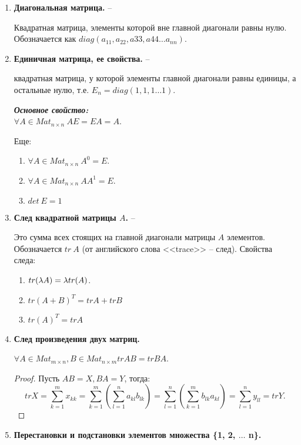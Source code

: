 \begin{enumerate}
	\item \textbf{Диагональная матрица.} --
	
	Квадратная матрица, элементы которой вне главной диагонали равны нулю. Обозначается как $diag(a_{11}, a_{22}, a{33}, a{44} \ldots a_{nn})$.
	
	\item \textbf{Единичная матрица, ее свойства.} --
	
	квадратная матрица, у которой элементы главной диагонали равны единицы, а остальные нулю, т.е. $E_n = diag(1,1,1 \ldots 1)$. 
	
	\textit{\textbf{Основное свойство:}}\\
	$\forall A \in Mat_{n \times n}\ AE = EA = A$.
	
	Еще: 	
	\begin{enumerate}
		\item $\forall A \in Mat_{n \times n}\ A^0 = E$.
		\item $\forall A \in Mat_{n \times n}\ A A^{1} = E$.
		\item $det\ E = 1$
	\end{enumerate}
	
	\item \textbf{След квадратной матрицы $A$.} --
	
	Это сумма всех стоящих на главной диагонали матрицы $A$ элементов. \\
	Обозначается $tr\ A$ (от английского слова <<trace>> -- след).
	Свойства следа:
	\begin{enumerate}
		\item $tr(\lambda A) = \lambda tr(A)$.
		\item $tr(A + B)^T = trA + trB$
		\item $tr(A)^T = trA$
	\end{enumerate}
	
	\item \textbf{След произведения двух матриц.}
	
	$\forall A \in Mat_{m \times n}, B \in Mat_{n \times m} trAB = tr BA$.
	\begin{proof}
		Пусть $AB = X, BA = Y$, тогда:
		\[
		tr X = \sum_{k=1}^{m} x_{kk} = \sum_{k=1}^{m}\left(\sum_{l=1}^{n} a_{kl}b_{lk}\right) = \sum_{l=1}^{n} \left( \sum_{k=1}^{m}b_{lk}a_{kl} \right) = \sum_{l=1}^{n}y_{ll} = tr Y.
		\]
	\end{proof}
	
	\item \textbf{Перестановки и подстановки элементов множества \{1, 2, $\ldots$ n\}.}
	

\end{enumerate}
